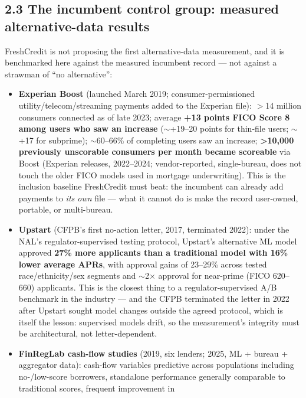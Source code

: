 \documentclass[
]{article}
\begin{document}
\subsection{2.3 The incumbent control group: measured alternative-data
results}\label{the-incumbent-control-group-measured-alternative-data-results}

FreshCredit is not proposing the first alternative-data measurement, and
it is benchmarked here against the measured incumbent record --- not
against a strawman of ``no alternative'':

\begin{itemize}
\item
  \textbf{Experian Boost} (launched March 2019; consumer-permissioned
  utility/telecom/streaming payments added to the Experian file):
  \(>\)14 million consumers connected as of late 2023; average
  \textbf{+13 points FICO Score 8 among users who saw an increase}
  (\(\sim\)+19--20 points for thin-file users; \(\sim\)+17 for
  subprime); \(\sim\)60--66\% of completing users saw an increase;
  \textbf{\textgreater10,000 previously unscorable consumers per month
  became scoreable} via Boost (Experian releases, 2022--2024;
  vendor-reported, single-bureau, does not touch the older FICO models
  used in mortgage underwriting). This is the inclusion baseline
  FreshCredit must beat: the incumbent can already add payments to
  \emph{its own} file --- what it cannot do is make the record
  user-owned, portable, or multi-bureau.
\item
  \textbf{Upstart} (CFPB's first no-action letter, 2017, terminated
  2022): under the NAL's regulator-supervised testing protocol,
  Upstart's alternative ML model approved \textbf{27\% more applicants
  than a traditional model with 16\% lower average APRs}, with approval
  gains of 23--29\% across tested race/ethnicity/sex segments and
  \(\sim\)2\(\times\) approval for near-prime (FICO 620--660)
  applicants. This is the closest thing to a regulator-supervised A/B
  benchmark in the industry --- and the CFPB terminated the letter in
  2022 after Upstart sought model changes outside the agreed protocol,
  which is itself the lesson: supervised models drift, so the
  measurement's integrity must be architectural, not letter-dependent.
\item
  \textbf{FinRegLab cash-flow studies} (2019, six lenders; 2025, ML +
  bureau + aggregator data): cash-flow variables predictive across
  populations including no-/low-score borrowers, standalone performance
  generally comparable to traditional scores, frequent improvement in

\end{itemize}
\end{document}
